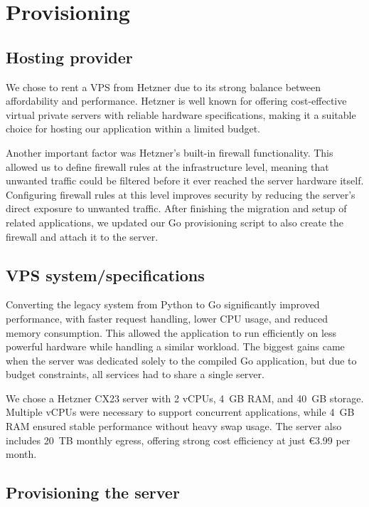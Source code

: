 \section{Provisioning}

\subsection{Hosting provider}

We chose to rent a VPS from Hetzner due to its strong balance between affordability and performance. Hetzner is well known for offering cost-effective virtual private servers with reliable hardware specifications, making it a suitable choice for hosting our application within a limited budget.

Another important factor was Hetzner's built-in firewall functionality. This allowed us to define firewall rules at the infrastructure level, meaning that unwanted traffic could be filtered before it ever reached the server hardware itself. Configuring firewall rules at this level improves security by reducing the server's direct exposure to unwanted traffic. After finishing the migration and setup of related applications, we updated our Go provisioning script to also create the firewall and attach it to the server.

\subsection{VPS system/specifications}

Converting the legacy system from Python to Go significantly improved performance, with faster request handling, lower CPU usage, and reduced memory consumption. This allowed the application to run efficiently on less powerful hardware while handling a similar workload. The biggest gains came when the server was dedicated solely to the compiled Go application, but due to budget constraints, all services had to share a single server.

We chose a Hetzner CX23 server with 2 vCPUs, 4~GB RAM, and 40~GB storage. Multiple vCPUs were necessary to support concurrent applications, while 4~GB RAM ensured stable performance without heavy swap usage. The server also includes 20~TB monthly egress, offering strong cost efficiency at just \euro3.99 per month.

\subsection{Provisioning the server}

